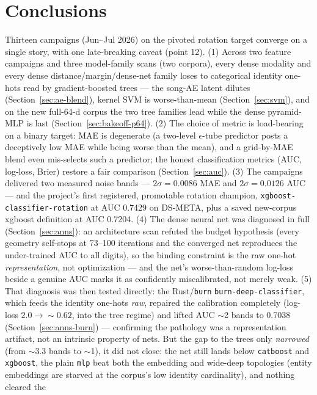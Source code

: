 \documentclass[11pt]{article}
\begin{document}
\section{Conclusions}
\label{sec:conclusions}
Thirteen campaigns (Jun--Jul 2026) on the pivoted rotation target converge
on a single story, with one late-breaking caveat (point 12). (1) Across two feature campaigns and three model-family scans (two
corpora), every dense modality and every dense distance/margin/dense-net family
loses to categorical identity one-hots read by gradient-boosted trees --- the
song-AE latent dilutes (Section~\ref{sec:ae-blend}), kernel SVM is
worse-than-mean (Section~\ref{sec:svm}), and on the new full-64-d corpus the two
tree families lead while the dense pyramid-MLP is last
(Section~\ref{sec:bakeoff-p64}). (2) The choice of metric is load-bearing on a
binary target: MAE is degenerate (a two-level $\epsilon$-tube predictor posts a
deceptively low MAE while being worse than the mean), and a grid-by-MAE blend
even mis-selects such a predictor; the honest classification metrics (AUC,
log-loss, Brier) restore a fair comparison (Section~\ref{sec:auc}). (3) The
campaigns delivered two measured noise bands --- $2\sigma=0.0086$ MAE and
$2\sigma=0.0126$ AUC --- and the project's first registered, promotable rotation
champion, \texttt{xgboost-classifier-rotation} at AUC 0.7429 on DS-META, plus a
saved new-corpus xgboost definition at AUC 0.7204. (4) The dense neural net was
diagnosed in full (Section~\ref{sec:anns}): an architecture scan refuted the
budget hypothesis (every geometry self-stops at 73--100 iterations and the
converged net reproduces the under-trained AUC to all digits), so the binding
constraint is the raw one-hot \emph{representation}, not optimization --- and the
net's worse-than-random log-loss beside a genuine AUC marks it as confidently
miscalibrated, not merely weak. (5) That diagnosis was then tested directly: the
Rust/\texttt{burn} \texttt{burn-deep-classifier}, which feeds the identity
one-hots \emph{raw}, repaired the calibration completely (log-loss
$2.0\to\sim 0.62$, into the tree regime) and lifted AUC $\sim$2 bands to
\num{0.7038} (Section~\ref{sec:anns-burn}) --- confirming the pathology was a
representation artifact, not an intrinsic property of nets. But the gap to the
trees only \emph{narrowed} (from $\sim$3.3 bands to $\sim$1), it did not close:
the net still lands below \texttt{catboost} and \texttt{xgboost}, the plain
\texttt{mlp} beat both the embedding and wide-deep topologies (entity embeddings
are starved at the corpus's low identity cardinality), and nothing cleared the
\end{document}
